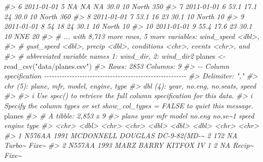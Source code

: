 \documentclass[
]{book}
\newenvironment{Shaded}{\begin{snugshade}}{\end{snugshade}}
\newcommand{\CommentTok}[1]{\textcolor[rgb]{0.56,0.35,0.01}{\textit{#1}}}
\newcommand{\FunctionTok}[1]{\textcolor[rgb]{0.00,0.00,0.00}{#1}}
\newcommand{\NormalTok}[1]{#1}
\newcommand{\OtherTok}[1]{\textcolor[rgb]{0.56,0.35,0.01}{#1}}
\newcommand{\StringTok}[1]{\textcolor[rgb]{0.31,0.60,0.02}{#1}}
\begin{document}
\begin{Shaded}
\begin{Highlighting}[]
\CommentTok{\#\textgreater{}  6 2011{-}01{-}01     5  NA        NA         NA     30.0         10 North       350}
\CommentTok{\#\textgreater{}  7 2011{-}01{-}01     6  53.1      17.1       24     30.0         10 North       360}
\CommentTok{\#\textgreater{}  8 2011{-}01{-}01     7  53.1      16         23     30.1         10 North        10}
\CommentTok{\#\textgreater{}  9 2011{-}01{-}01     8  54        18         24     30.1         10 North        10}
\CommentTok{\#\textgreater{} 10 2011{-}01{-}01     9  55.4      17.6       23     30.1         10 NNE          20}
\CommentTok{\#\textgreater{} \# ... with 8,713 more rows, 5 more variables: wind\_speed \textless{}dbl\textgreater{},}
\CommentTok{\#\textgreater{} \#   gust\_speed \textless{}dbl\textgreater{}, precip \textless{}dbl\textgreater{}, conditions \textless{}chr\textgreater{}, events \textless{}chr\textgreater{}, and}
\CommentTok{\#\textgreater{} \#   abbreviated variable names 1: wind\_dir, 2: wind\_dir2}
\NormalTok{planes }\OtherTok{\textless{}{-}} \FunctionTok{read\_csv}\NormalTok{(}\StringTok{"data/planes.csv"}\NormalTok{)}
\CommentTok{\#\textgreater{} Rows: 2853 Columns: 9}
\CommentTok{\#\textgreater{} {-}{-} Column specification {-}{-}{-}{-}{-}{-}{-}{-}{-}{-}{-}{-}{-}{-}{-}{-}{-}{-}{-}{-}{-}{-}{-}{-}{-}{-}{-}{-}{-}{-}{-}{-}{-}{-}{-}{-}{-}{-}{-}{-}{-}{-}{-}{-}{-}{-}{-}{-}{-}{-}{-}{-}{-}{-}{-}{-}}
\CommentTok{\#\textgreater{} Delimiter: ","}
\CommentTok{\#\textgreater{} chr (5): plane, mfr, model, engine, type}
\CommentTok{\#\textgreater{} dbl (4): year, no.eng, no.seats, speed}
\CommentTok{\#\textgreater{} }
\CommentTok{\#\textgreater{} i Use \textasciigrave{}spec()\textasciigrave{} to retrieve the full column specification for this data.}
\CommentTok{\#\textgreater{} i Specify the column types or set \textasciigrave{}show\_col\_types = FALSE\textasciigrave{} to quiet this message.}
\NormalTok{planes}
\CommentTok{\#\textgreater{} \# A tibble: 2,853 x 9}
\CommentTok{\#\textgreater{}    plane   year mfr               model        no.eng no.se\textasciitilde{}1 speed engine type }
\CommentTok{\#\textgreater{}    \textless{}chr\textgreater{}  \textless{}dbl\textgreater{} \textless{}chr\textgreater{}             \textless{}chr\textgreater{}         \textless{}dbl\textgreater{}   \textless{}dbl\textgreater{} \textless{}dbl\textgreater{} \textless{}chr\textgreater{}  \textless{}chr\textgreater{}}
\CommentTok{\#\textgreater{}  1 N576AA  1991 MCDONNELL DOUGLAS DC{-}9{-}82(MD{-}\textasciitilde{}      2     172    NA Turbo\textasciitilde{} Fixe\textasciitilde{}}
\CommentTok{\#\textgreater{}  2 N557AA  1993 MARZ BARRY        KITFOX IV         1       2    NA Recip\textasciitilde{} Fixe\textasciitilde{}}

\end{Highlighting}
\end{Shaded}
\end{document}
